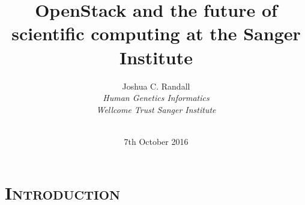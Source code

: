 \documentclass[xcolor=x11names,compress]{beamer}
\makeatletter
\renewcommand{\(}{\begin{columns}}
\renewcommand{\)}{\end{columns}}
\newcommand{\<}[1]{\begin{column}{#1}}
\renewcommand{\>}{\end{column}}
\newenvironment{backgroundblock}[2]{%
  \global\setbox\@backgroundblock=\vbox\bgroup%
    \unvbox\@backgroundblock%
    \vbox to0pt\bgroup\vskip#2\hbox to0pt\bgroup\hskip#1\relax%
}{\egroup\egroup\egroup}
\makeatother
\begin{document}
\newcommand{\seqbackground}{
	\begin{backgroundblock}{0cm}{0cm}
		\vbox to \paperheight{\vfil\hbox to \paperwidth{\hfil
		\begin{overpic}[grid=false,height=0.85\paperheight]{images/Sanger_-_sequencers_1495-1300px_-_by-3_0_-_GRL}
		\put(88,0.5){\textcolor{gray}{\fontsize{4}{6}\selectfont Photo: Genome Research Limited}}	
		\end{overpic}
		\hfil\hskip 2mm}\vfil}
	\end{backgroundblock}
}

\newcommand{\cloudsbackground}{
	\begin{backgroundblock}{-2pt}{-2pt}
		\vbox to \paperheight{\vfil\hbox to \paperwidth{\hfil
		\begin{overpic}[grid=false,height=0.85\paperheight]{images/Keith_Pomakis_-_Cumulus_Clouds_Over_Jamaica_-_cc-by-sa-2_5_-_wikimedia_-_cropped}
		\put(88,0.5){\textcolor{gray}{\fontsize{4}{6}\selectfont Photo: Keith Pomakis}}
		\end{overpic}
		\hfil\hskip 2mm}\vfil}
	\end{backgroundblock}
}


\section*{\scshape Introduction}
\begin{frame}
\title{OpenStack and the future of scientific computing at the Sanger Institute}
\author{
	Joshua C. Randall \\
	{\it 
	Human Genetics Informatics \\
	Wellcome Trust Sanger Institute 
	}\\
}
\date{
	 \\
	\vspace{0.5cm}
	7th October 2016
}
\titlepage
\end{frame}
\end{document}
